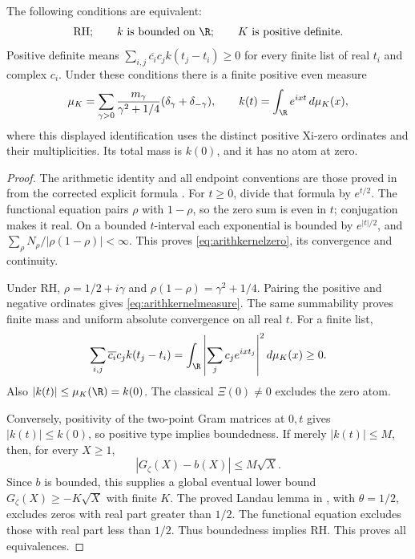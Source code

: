 \begin{proposition}
The following conditions are equivalent:
\[
 \mathrm{RH};\qquad k\text{ is bounded on }\R;\qquad
 K\text{ is positive definite}.
\]
Positive definite means
\(\sum_{i,j}\overline{c_i}c_jk(t_j-t_i)\ge0\)
for every finite list of real \(t_i\) and complex \(c_i\).
Under these conditions there is a finite positive even measure
\begin{equation}\label{eq:arithkernelmeasure}
 \mu_K=\sum_{\gamma>0}
 \frac{m_\gamma}{\gamma^2+1/4}
       (\delta_\gamma+\delta_{-\gamma}),\qquad
 k(t)=\int_\R e^{ixt}\,d\mu_K(x),
\end{equation}
where this displayed identification uses the distinct positive
Xi-zero ordinates and their multiplicities. Its total mass is
\(k(0)\), and it has no atom at zero.
\end{proposition}
\begin{proof}
The arithmetic identity and all endpoint conventions are those proved in
 from the corrected explicit formula
\cite[corrected Lemma 2.1, pp.~1--2]{ramare}.
For \(t\ge0\), divide that formula by \(e^{t/2}\).
The functional equation pairs \(\rho\) with \(1-\rho\), so the
zero sum is even in \(t\); conjugation makes it real.
On a bounded \(t\)-interval each exponential is bounded by
\(e^{|t|/2}\), and
\(\sum_\rho N_\rho/|\rho(1-\rho)|<\infty\).
This proves \eqref{eq:arithkernelzero}, its convergence and continuity.

Under RH, \(\rho=1/2+i\gamma\) and
\(\rho(1-\rho)=\gamma^2+1/4\).
Pairing the positive and negative ordinates gives
\eqref{eq:arithkernelmeasure}. The same summability proves finite
mass and uniform absolute convergence on all real \(t\).
For a finite list,
\[
 \sum_{i,j}\overline{c_i}c_jk(t_j-t_i)
 =\int_\R\left|\sum_jc_je^{ixt_j}\right|^2d\mu_K(x)\ge0.
\]
Also \(|k(t)|\le\mu_K(\R)=k(0)\).
The classical \(\Xi(0)\ne0\) excludes the zero atom.

Conversely, positivity of the two-point Gram matrices at \(0,t\)
gives \(|k(t)|\le k(0)\), so positive type implies boundedness.
If merely \(|k(t)|\le M\), then, for every \(X\ge1\),
\[
 |G_\zeta(X)-b(X)|\le M\sqrt X.
\]
Since \(b\) is bounded, this supplies a global eventual lower bound
\(G_\zeta(X)\ge-K\sqrt X\) with finite \(K\).
The proved Landau lemma in , with \(\theta=1/2\),
excludes zeros with real part greater than \(1/2\).
The functional equation excludes those with real part less than \(1/2\).
Thus boundedness implies RH. This proves all equivalences.
\end{proof}

